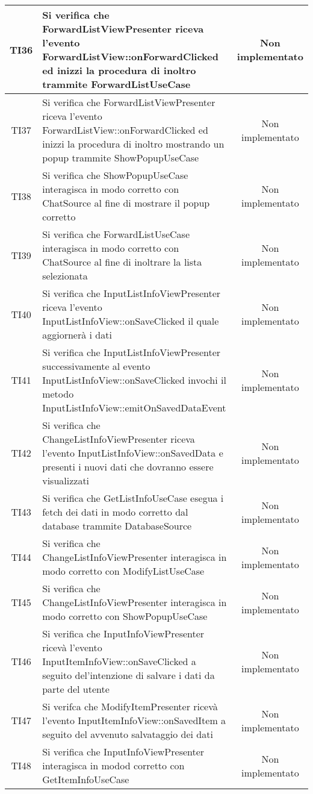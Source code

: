 \begin{center}
\begin{longtable}{|c|>{\centering}m{10cm}|c|}
		TI36 & Si verifica che ForwardListViewPresenter riceva l'evento ForwardListView::onForwardClicked ed inizzi la procedura di inoltro trammite ForwardListUseCase & Non implementato \\ \hline
		TI37 & Si verifica che ForwardListViewPresenter riceva l'evento ForwardListView::onForwardClicked ed inizzi la procedura di inoltro mostrando un popup trammite ShowPopupUseCase & Non implementato \\ \hline
		TI38 & Si verifica che ShowPopupUseCase interagisca in modo corretto con ChatSource al fine di mostrare il popup corretto & Non implementato \\ \hline
		TI39 & Si verifica che ForwardListUseCase interagisca in modo corretto con ChatSource al fine di inoltrare la lista selezionata & Non implementato \\ \hline
		TI40 & Si verifica che InputListInfoViewPresenter riceva l'evento InputListInfoView::onSaveClicked il quale aggiornerà i dati & Non implementato \\ \hline
		TI41 & Si verifica che InputListInfoViewPresenter successivamente al evento InputListInfoView::onSaveClicked invochi il metodo InputListInfoView::emitOnSavedDataEvent & Non implementato \\ \hline
		TI42 & Si verifica che ChangeListInfoViewPresenter riceva l'evento InputListInfoView::onSavedData e presenti i nuovi dati che dovranno essere visualizzati & Non implementato \\ \hline
		TI43 & Si verifica che GetListInfoUseCase esegua i fetch dei dati in modo corretto dal database trammite DatabaseSource & Non implementato \\ \hline
		TI44 & Si verifica che ChangeListInfoViewPresenter interagisca in modo corretto con ModifyListUseCase & Non implementato \\ \hline
		TI45 & Si verifica che ChangeListInfoViewPresenter interagisca in modo corretto con ShowPopupUseCase & Non implementato \\ \hline
		TI46 & Si verifica che InputInfoViewPresenter ricevà l'evento InputItemInfoView::onSaveClicked a seguito del'intenzione di salvare i dati da parte del utente & Non implementato \\ \hline
		TI47 & Si verifca che ModifyItemPresenter ricevà l'evento InputItemInfoView::onSavedItem a seguito del avvenuto salvataggio dei dati & Non implementato \\ \hline
		TI48 & Si verifica che InputInfoViewPresenter interagisca in modod corretto con GetItemInfoUseCase & Non implementato \\ \hline

\end{longtable}
\end{center}
